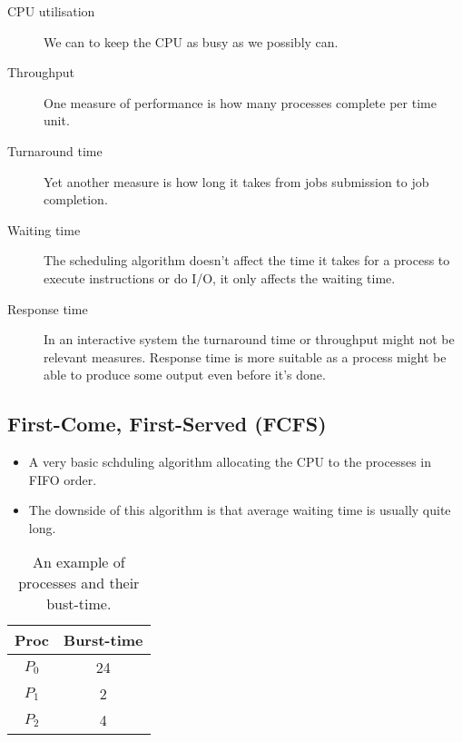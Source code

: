 \documentclass{beamer}
\begin{document}
\begin{frame}{\insertsubsectionhead}
  \begin{description}
    \item[CPU utilisation] We can to keep the CPU as busy as we possibly can.

    \item[Throughput] One measure of performance is how many processes complete 
      per time unit.

    \item[Turnaround time] Yet another measure is how long it takes from jobs 
      submission to job completion.

    \item[Waiting time] The scheduling algorithm doesn't affect the time it 
      takes for a process to execute instructions or do I/O, it only affects 
      the waiting time.

    \item[Response time] In an interactive system the turnaround time or 
      throughput might not be relevant measures.
      Response time is more suitable as a process might be able to produce some 
      output even before it's done.

  \end{description}
\end{frame}

\subsection{First-Come, First-Served (FCFS)}

\begin{frame}{\insertsubsectionhead}
  \begin{itemize}
    \item A very basic schduling algorithm allocating the CPU to the processes 
      in FIFO order.

    \item The downside of this algorithm is that average waiting time is 
      usually quite long.

  \end{itemize}
\end{frame}

\begin{frame}{\insertsubsectionhead}
  \begin{table}
    \begin{tabular}{cc}
      \textbf{Proc} & \textbf{Burst-time} \\
      \toprule
      \(P_0\)   & 24 \\
      \(P_1\)   & 2 \\
      \(P_2\)   & 4 \\
      \bottomrule
    \end{tabular}
    \caption{An example of processes and their bust-time.}
  \end{table}
\end{frame}
\end{document}
